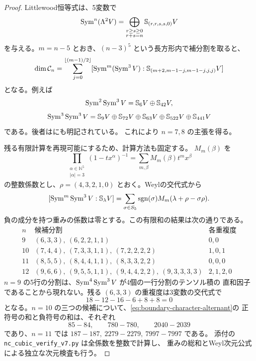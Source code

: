 \begin{proof}
Littlewood恒等式\cite[式(6)]{BeteaWheeler}は、5変数で
\[
 \operatorname{Sym}^n(\Lambda^2V)=
 \bigoplus_{\substack{r\ge s\ge0\\r+s=n}}
           \mathbb S_{(r,r,s,s,0)}V
\]
を与える。$m=n-5$ とおき、$(n-3)^5$ という長方形内で補分割を取ると、
\begin{equation}\label{eq:boundary-plethysm-candidates}
 \dim\mathcal C_n=
 \sum_{j=0}^{\lfloor(m-1)/2\rfloor}
 [\operatorname{Sym}^m(\operatorname{Sym}^3V):
   \mathbb S_{(m+2,m-1-j,m-1-j,j,j)}V]
\end{equation}
となる。例えば
\[
 \operatorname{Sym}^2\operatorname{Sym}^3V=\mathbb S_6V\oplus\mathbb S_{42}V,
\]
\[
 \operatorname{Sym}^3\operatorname{Sym}^3V=
 \mathbb S_9V\oplus\mathbb S_{72}V\oplus\mathbb S_{63}V
 \oplus\mathbb S_{522}V\oplus\mathbb S_{441}V
\]
である。後者は\cite[Example 1.6]{DeBoeckPagetWildon}にも明記されている。
これにより $n=7,8$ の主張を得る。

残る有限計算を再現可能にするため、計算方法も固定する。
$M_m(\beta)$ を
\[
 \prod_{\substack{\alpha\in\mathbb N^5\\|\alpha|=3}}
       (1-tx^\alpha)^{-1}
   =\sum_{m,\beta}M_m(\beta)t^mx^\beta
\]
の整数係数とし、$\rho=(4,3,2,1,0)$ とおく。Weylの交代式から
\begin{equation}\label{eq:boundary-character-alternant}
 [\operatorname{Sym}^m\operatorname{Sym}^3V:\mathbb S_\lambda V]
 =\sum_{\sigma\in S_5}\operatorname{sgn}(\sigma)
     M_m(\lambda+\rho-\sigma\rho).
\end{equation}
負の成分を持つ重みの係数は零とする。この有限和の結果は次の通りである。
\[
\begin{array}{c|l|l}
 n&\text{候補分割}&\text{各重複度}\\ \hline
 9 &(6,3,3),\ (6,2,2,1,1)&0,0\\
 10&(7,4,4),\ (7,3,3,1,1),\ (7,2,2,2,2)&1,0,1\\
 11&(8,5,5),\ (8,4,4,1,1),\ (8,3,3,2,2)&0,0,0\\
 12&(9,6,6),\ (9,5,5,1,1),\ (9,4,4,2,2),\ (9,3,3,3,3)&2,1,2,0
\end{array}
\]
$n=9$ の5行の分割は、$\operatorname{Sym}^4\operatorname{Sym}^3V$ が4個の一行分割のテンソル積の
直和因子であることから現れない。残る $(6,3,3)$ の重複度は3変数の交代式で
\[
                       18-12-16-6+8+8=0
\]
となる。$n=10$ の三つの候補について、\eqref{eq:boundary-character-alternant}の
正符号の和と負符号の和は、それぞれ
\[
                    85-84,\qquad780-780,\qquad2040-2039
\]
であり、$n=11$ では $187-187,\ 2279-2279,\ 7997-7997$ である。
添付の \texttt{nc\_cubic\_verify\_v7.py} は全係数を整数で計算し、
重みの総和とWeyl次元公式による独立な次元検査も行う。
\end{proof}

